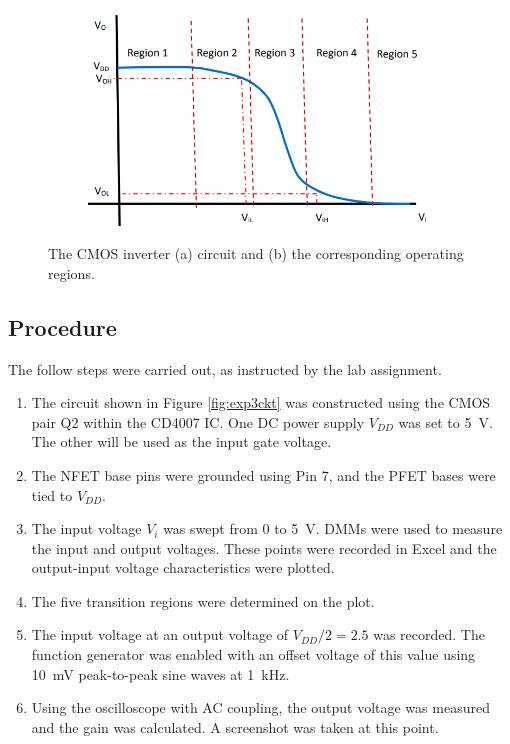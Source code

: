 \documentclass{report}
\begin{document}
\begin{figure}[h]
\begin{subfigure}{0.65\linewidth}
		\includegraphics[width=\linewidth]{exp3regions}
		\caption{}
		\label{fig:exp3regions}
	\end{subfigure}
	\caption{The CMOS inverter (a) circuit and (b) the corresponding operating regions.}
\end{figure}

\subsection{Procedure}
The follow steps were carried out, as instructed by the lab assignment.
\begin{enumerate}
	\item The circuit shown in Figure \ref{fig:exp3ckt} was constructed using the CMOS pair Q2 within the CD4007 IC. One DC power supply $V_{DD}$ was set to \SI{5}{\V}. The other will be used as the input gate voltage.
	\item The NFET base pins were grounded using Pin 7, and the PFET bases were tied to $V_{DD}$.
	\item The input voltage $V_i$ was swept from \num{0} to \SI{5}{\V}. DMMs were used to measure the input and output voltages. These points were recorded in Excel and the output-input voltage characteristics were plotted.
	\item The five transition regions were determined on the plot.
	\item The input voltage at an output voltage of $V_{DD}/2=2.5$ was recorded. The function generator was enabled with an offset voltage of this value using \SI{10}{\mV} peak-to-peak sine waves at \SI{1}{\kHz}.
	\item Using the oscilloscope with AC coupling, the output voltage was measured and the gain was calculated. A screenshot was taken at this point.
\end{enumerate}
\end{document}
